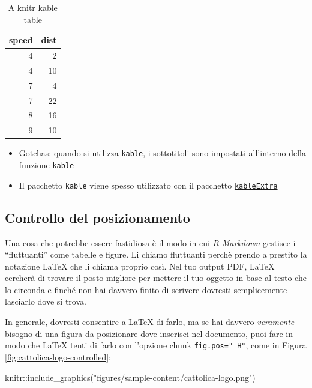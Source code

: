 \documentclass[a4paper, 11pt, nobind]{templates/ociamthesis}
\providecommand{\tightlist}{%
  \setlength{\itemsep}{0pt}\setlength{\parskip}{0pt}}
\newenvironment{Shaded}{\begin{snugshade}}{\end{snugshade}}
\newcommand{\FunctionTok}[1]{\textcolor[rgb]{0.00,0.00,0.00}{#1}}
\newcommand{\NormalTok}[1]{#1}
\newcommand{\SpecialCharTok}[1]{\textcolor[rgb]{0.00,0.00,0.00}{#1}}
\newcommand{\StringTok}[1]{\textcolor[rgb]{0.31,0.60,0.02}{#1}}
\renewenvironment{Shaded}
{
  \vspace{10pt}%
  \begin{snugshade}%
}{%
  \end{snugshade}%
  \vspace{8pt}%
}
\begin{document}
\begin{table}

\caption{\label{tab:cars-table}A knitr kable table}
\centering
\begin{tabular}[t]{r|r}
\hline
speed & dist\\
\hline
4 & 2\\
\hline
4 & 10\\
\hline
7 & 4\\
\hline
7 & 22\\
\hline
8 & 16\\
\hline
9 & 10\\
\hline
\end{tabular}
\end{table}

\begin{itemize}
\tightlist
\item
  Gotchas: quando si utilizza \href{https://www.rdocumentation.org/packages/knitr/versions/1.21/topics/kable}{\texttt{kable}}, i sottotitoli sono impostati all'interno della funzione \texttt{kable}
\item
  Il pacchetto \texttt{kable} viene spesso utilizzato con il pacchetto \href{https://cran.r-project.org/web/packages/kableExtra/vignettes/awesome_table_in_html.html}{\texttt{kableExtra}}
\end{itemize}

\hypertarget{controllo-del-posizionamento}{%
\subsection{Controllo del posizionamento}\label{controllo-del-posizionamento}}

Una cosa che potrebbe essere fastidiosa è il modo in cui \emph{R Markdown} gestisce i ``fluttuanti'' come tabelle e figure. Li chiamo fluttuanti perchè prendo a prestito la notazione LaTeX che li chiama proprio così.
Nel tuo output PDF, LaTeX cercherà di trovare il posto migliore per mettere il tuo oggetto in base al testo che lo circonda e finché non hai davvero finito di scrivere dovresti semplicemente lasciarlo dove si trova.

In generale, dovresti consentire a LaTeX di farlo, ma se hai davvero \emph{veramente} bisogno di una figura da posizionare dove inserisci nel documento, puoi fare in modo che LaTeX tenti di farlo con l'opzione chunk \texttt{fig.pos="\ H"}, come in Figura \ref{fig:cattolica-logo-controlled}:

\begin{Shaded}
\begin{Highlighting}[]
\NormalTok{knitr}\SpecialCharTok{::}\FunctionTok{include\_graphics}\NormalTok{(}\StringTok{"figures/sample{-}content/cattolica{-}logo.png"}\NormalTok{)}
\end{Highlighting}
\end{Shaded}
\end{document}

